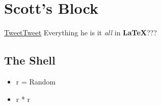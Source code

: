 \section{Scott's Block}


\href{http://www.twitter.com}{TweetTweet} 
Everything he is it \textit{all} in \textbf{LaTeX}??? \cite{Ferry_2006}


\subsection{The Shell}
\begin{itemize}
\item r = Random
\item r * r
\end{itemize}